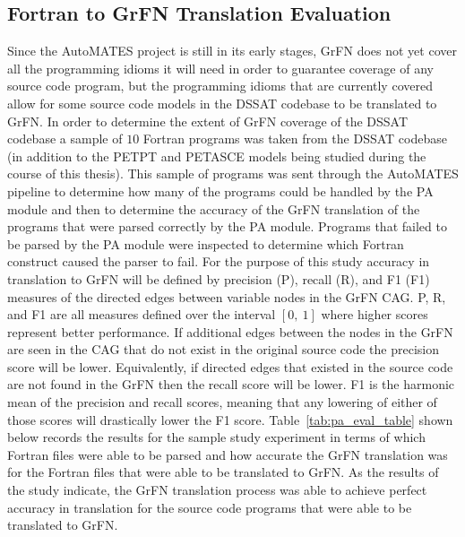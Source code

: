 \subsection{Fortran to GrFN Translation Evaluation\label{sec:translation_eval}}
Since the AutoMATES project is still in its early stages, GrFN does not yet cover all the programming idioms it will need in order to guarantee coverage of any source code program, but the programming idioms that are currently covered allow for some source code models in the DSSAT codebase to be translated to GrFN.
In order to determine the extent of GrFN coverage of the DSSAT codebase a sample of $10$ Fortran programs was taken from the DSSAT codebase (in addition to the PETPT and PETASCE models being studied during the course of this thesis).
This sample of programs was sent through the AutoMATES pipeline to determine how many of the programs could be handled by the PA module and then to determine the accuracy of the GrFN translation of the programs that were parsed correctly by the PA module.
Programs that failed to be parsed by the PA module were inspected to determine which Fortran construct caused the parser to fail.
For the purpose of this study accuracy in translation to GrFN will be defined by precision (P), recall (R), and F1 (F1) measures of the directed edges between variable nodes in the GrFN CAG.
P, R, and F1 are all measures defined over the interval $[0,~1]$ where higher scores represent better performance.
If additional edges between the nodes in the GrFN are seen in the CAG that do not exist in the original source code the precision score will be lower.
Equivalently, if directed edges that existed in the source code are not found in the GrFN then the recall score will be lower.
F1 is the harmonic mean of the precision and recall scores, meaning that any lowering of either of those scores will drastically lower the F1 score.
Table~\ref{tab:pa_eval_table} shown below records the results for the sample study experiment in terms of which Fortran files were able to be parsed and how accurate the GrFN translation was for the Fortran files that were able to be translated to GrFN.
As the results of the study indicate, the GrFN translation process was able to achieve perfect accuracy in translation for the source code programs that were able to be translated to GrFN.

